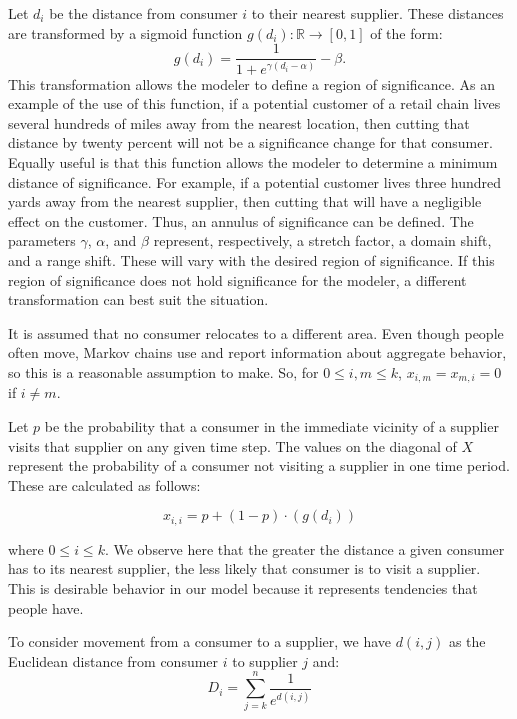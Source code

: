 \documentclass[twoside,twocolumn]{article}
\begin{document}
Let $d_{i}$ be the distance from consumer $i$ to their nearest supplier.
These distances are transformed by a sigmoid function $g(d_i): \mathbb{R} \rightarrow [0,1]$ of the form:
\begin{equation}
g(d_i) = \frac{1}{1 + e^{\gamma(d_i-\alpha)}} - \beta.
\end{equation}
This transformation allows the modeler to define a region of significance.
As an example of the use of this function, if a potential customer of a retail chain lives several hundreds of miles away from the nearest location, then cutting that distance by twenty percent will not be a significance change for that consumer.
Equally useful is that this function allows the modeler to determine a minimum distance of significance.
For example, if a potential customer lives three hundred yards away from the nearest supplier, then cutting that will have a negligible effect on the customer.
Thus, an annulus of significance can be defined.
The parameters $\gamma$, $\alpha$, and $\beta$ represent, respectively, a stretch factor, a domain shift, and a range shift.
These will vary with the desired region of significance.
If this region of significance does not hold significance for the modeler, a different transformation can best suit the situation.

It is assumed that no consumer relocates to a different area.
Even though people often move, Markov chains use and report information about aggregate behavior, so this is a reasonable assumption to make. %
So, for $0 \leq i,m \leq k$, $x_{i,m} = x_{m,i} = 0$ if $i \neq m$.

Let $p$ be the probability that a consumer in the immediate vicinity of a supplier visits that supplier on any given time step.
The values on the diagonal of $X$ represent the probability of a consumer not visiting a supplier in one time period.
These are calculated as follows:

$$x_{i,i} = p + (1-p) \cdot (g(d_{i}))$$

where $0 \leq i \leq k$.
We observe here that the greater the distance a given consumer has to its nearest supplier, the less likely that consumer is to visit a supplier.
This is desirable behavior in our model because it represents tendencies that people have.

To consider movement from a consumer to a supplier, we have $d(i, j)$ as the Euclidean distance from consumer $i$ to supplier $j$ and:
$$D_i = \sum_{j=k}^{n} \frac{1}{e^{d(i,j)}}$$
\end{document}

